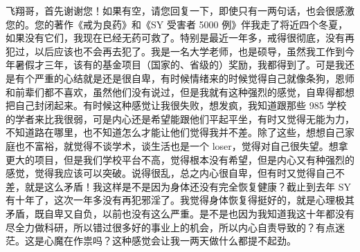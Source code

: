 \begin{case}
    飞翔哥，首先谢谢您！如果有空，请您回复一下，即使只有一两句话，也会很感激您的。您的著作《戒为良药》和《SY 受害者 5000 例》伴我走了将近四个冬夏，如果没有它们，我现在已经无药可救了。特别是最近一年多，戒得很彻底，没有再犯过，以后应该也不会再去犯了。我是一名大学老师，也是硕导，虽然我工作到今年暑假才三年，该有的基金项目（国家的、省级的）奖励，我都得到了。可是我还是有个严重的心结就是还是很自卑，有时候情绪来的时候觉得自己就像条狗，恩师和前辈们都不喜欢，虽然他们没有说过，但是我就有这种强烈的感觉，自卑得都想把自己封闭起来。有时候这种感觉让我很失败，想发疯，我知道跟那些 985 学校的学者来比我很弱，可是内心还是希望能跟他们平起平坐，有时又觉得无能为力，不知道路在哪里，也不知道怎么才能让他们觉得我并不差。除了这些，想想自己家庭也不富裕，就觉得不谈学术，谈生活也是一个 loser，觉得对自己很失望。想拿更大的项目，但是我们学校平台不高，觉得根本没有希望，但是内心又有种强烈的感觉，觉得我应该可以突破。说得很乱，总之内心很自卑，但有时又觉得自己不差，就是这么矛盾！我这样是不是因为身体还没有完全恢复健康？截止到去年 SY 有十年了，这次一年多没有再犯邪淫了。我觉得身体恢复得挺好的，就是心理极其矛盾，既自卑又自负，以前也没有这么严重。是不是也因为我知道我这十年都没有尽全力做科研，所以错过很多好的事业上的机会，所以内心自责导致的？有点迷茫。这是心魔在作祟吗？这种感觉会让我一两天做什么都提不起劲。


\end{case}

